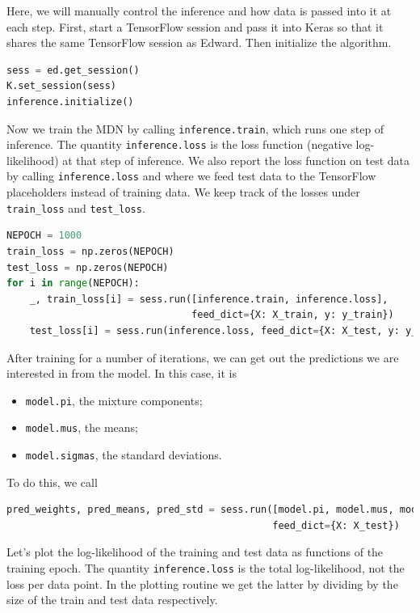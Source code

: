 Here, we will manually control the inference and how data is passed
into it at each step. First, start a TensorFlow session and pass it
into Keras so that it shares the same TensorFlow session as Edward.
Then initialize the algorithm.

\begin{lstlisting}[language=Python]
sess = ed.get_session()
K.set_session(sess)
inference.initialize()
\end{lstlisting}

Now we train the MDN by calling \texttt{inference.train}, which runs
one step of inference. The quantity \texttt{inference.loss} is the
loss function (negative log-likelihood) at that step of inference.  We
also report the loss function on test data by calling
\texttt{inference.loss} and where we feed test data to the TensorFlow
placeholders instead of training data.
We keep track of the losses under \texttt{train\_loss} and \texttt{test\_loss}.

\begin{lstlisting}[language=Python]
NEPOCH = 1000
train_loss = np.zeros(NEPOCH)
test_loss = np.zeros(NEPOCH)
for i in range(NEPOCH):
    _, train_loss[i] = sess.run([inference.train, inference.loss],
                                feed_dict={X: X_train, y: y_train})
    test_loss[i] = sess.run(inference.loss, feed_dict={X: X_test, y: y_test})
\end{lstlisting}

After training for a number of iterations,
we can get out the predictions we are interested in from
the model. In this case, it is

\begin{itemize}
\item
\texttt{model.pi}, the mixture components;
\item
\texttt{model.mus}, the means;
\item
\texttt{model.sigmas}, the standard deviations.
\end{itemize}

To do this, we call
\begin{lstlisting}[language=Python]
pred_weights, pred_means, pred_std = sess.run([model.pi, model.mus, model.sigmas],
                                              feed_dict={X: X_test})
\end{lstlisting}

Let's plot the log-likelihood of the training and test data as
functions of the training epoch. The quantity \texttt{inference.loss}
is the total log-likelihood, not the loss per data point.  In the
plotting routine we get the latter by dividing by the size of the
train and test data respectively.

